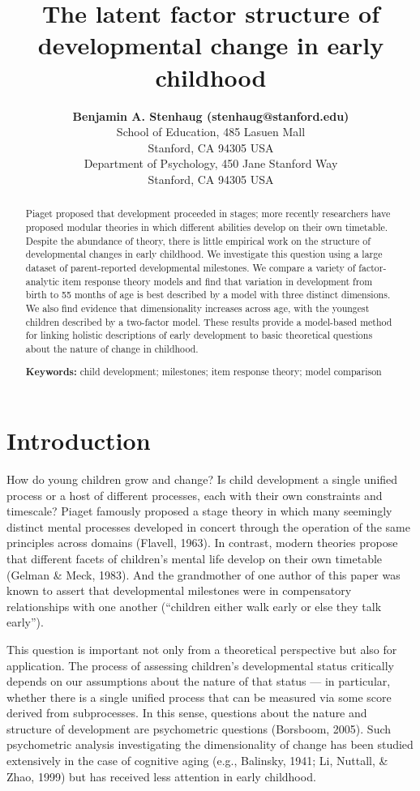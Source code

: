 \documentclass[10pt, letterpaper]{article}
\title{The latent factor structure of developmental change in early childhood}
\author{{\large \bf Benjamin A. Stenhaug (stenhaug@stanford.edu)} \\
	School of Education, 485 Lasuen Mall \\
	Stanford, CA 94305 USA
	\AND {\large \bf Michael C. Frank (mcfrank@stanford.edu)} \\
	Department of Psychology, 450 Jane Stanford Way \\
	Stanford, CA 94305 USA}
\begin{document}
\maketitle

\begin{abstract}
Piaget proposed that development proceeded in stages; more recently
researchers have proposed modular theories in which different abilities
develop on their own timetable. Despite the abundance of theory, there
is little empirical work on the structure of developmental changes in
early childhood. We investigate this question using a large dataset of
parent-reported developmental milestones. We compare a variety of
factor-analytic item response theory models and find that variation in
development from birth to 55 months of age is best described by a model
with three distinct dimensions. We also find evidence that
dimensionality increases across age, with the youngest children
described by a two-factor model. These results provide a model-based
method for linking holistic descriptions of early development to basic
theoretical questions about the nature of change in childhood.

\textbf{Keywords:}
child development; milestones; item response theory; model comparison
\end{abstract}

\hypertarget{introduction}{%
\section{Introduction}\label{introduction}}

How do young children grow and change? Is child development a single
unified process or a host of different processes, each with their own
constraints and timescale? Piaget famously proposed a stage theory in
which many seemingly distinct mental processes developed in concert
through the operation of the same principles across domains (Flavell,
1963). In contrast, modern theories propose that different facets of
children's mental life develop on their own timetable (Gelman \& Meck,
1983). And the grandmother of one author of this paper was known to
assert that developmental milestones were in compensatory relationships
with one another (``children either walk early or else they talk
early'').

This question is important not only from a theoretical perspective but
also for application. The process of assessing children's developmental
status critically depends on our assumptions about the nature of that
status --- in particular, whether there is a single unified process that
can be measured via some score derived from subprocesses. In this sense,
questions about the nature and structure of development are psychometric
questions (Borsboom, 2005). Such psychometric analysis investigating the
dimensionality of change has been studied extensively in the case of
cognitive aging (e.g., Balinsky, 1941; Li, Nuttall, \& Zhao, 1999) but
has received less attention in early childhood.
\end{document}
